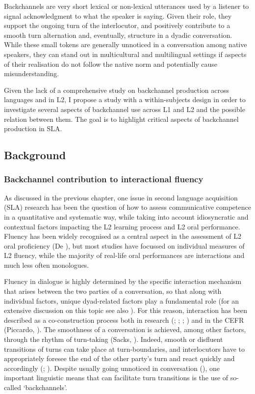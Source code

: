 Backchannels are very short lexical or non-lexical utterances used by a listener to signal acknowledgment to what the speaker is saying. Given their role, they support the ongoing turn of the interlocutor, and positively contribute to a smooth turn alternation and, eventually, structure in a dyadic conversation. While these small tokens are generally unnoticed in a conversation among native speakers, they can stand out in multicultural and multilingual settings if aspects of their realisation do not follow the native norm and potentially cause misunderstanding. 

Given the lack of a comprehensive study on backchannel production across languages and in L2, I propose a study with a within-subjects design in order to investigate several aspects of backchannel use across L1 and L2 and the possible relation between them. The goal is to highlight critical aspects of backchannel production in SLA. 

\subsection{Background}
\hypertarget{Toc191305942}{}\subsubsection{Backchannel contribution to interactional fluency}
\hypertarget{Toc191305943}{}
As discussed in the previous chapter, one issue in second language acquisition (SLA) research has been the question of how to assess communicative competence in a quantitative and systematic way, while taking into account idiosyncratic and contextual factors impacting the L2 learning process and L2 oral performance. Fluency has been widely recognised as a central aspect in the assessment of L2 oral proficiency (De \citealt{Jong2016}), but most studies have focussed on individual measures of L2 fluency, while the majority of real-life oral performances are interactions and much less often monologues.

Fluency in dialogue is highly determined by the specific interaction mechanism that arises between the two parties of a conversation, so that along with individual factors, unique dyad-related factors play a fundamental role (for an extensive discussion on this topic see also ). For this reason, interaction has been described as a co-construction process both in research (\citealt{Hall1995}; \citealt{HeYoung1998}; \citealt{JacobyOchs1995}; \citealt{McCarthy2009}) and in the CEFR (Piccardo, \citealt{GoodierNorth2018}). The smoothness of a conversation is achieved, among other factors, through the rhythm of turn-taking (Sacks, \citealt{SchegloffJefferson1974}). Indeed, smooth or disfluent transitions of turns can take place at turn-boundaries, and interlocutors have to appropriately foresee the end of the other party’s turn and react quickly and accordingly (\citealt{BögelsTorreira2015}; \citealt{Levinson2016}). Despite usually going unnoticed in conversation (\citealt{ShelleyGonzalez2013}), one important linguistic means that can facilitate turn transitions is the use of so-called ‘backchannels’.

